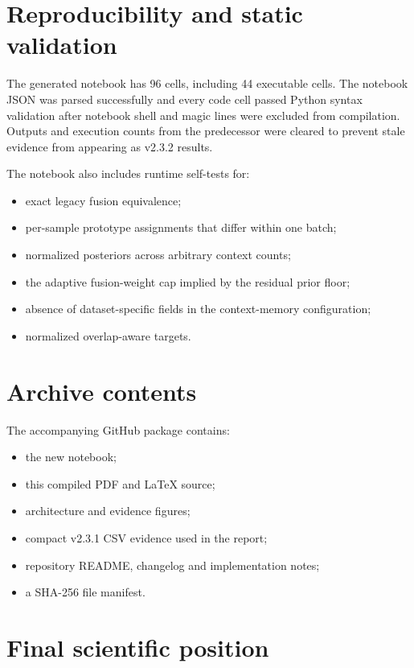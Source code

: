 \documentclass[11pt,a4paper]{article}
\begin{document}
\section{Reproducibility and static validation}

The generated notebook has 96 cells, including 44 executable cells. The notebook JSON was parsed successfully and every code cell passed Python syntax validation after notebook shell and magic lines were excluded from compilation. Outputs and execution counts from the predecessor were cleared to prevent stale evidence from appearing as v2.3.2 results.

The notebook also includes runtime self-tests for:

\begin{itemize}[leftmargin=1.5em]
\item exact legacy fusion equivalence;
\item per-sample prototype assignments that differ within one batch;
\item normalized posteriors across arbitrary context counts;
\item the adaptive fusion-weight cap implied by the residual prior floor;
\item absence of dataset-specific fields in the context-memory configuration;
\item normalized overlap-aware targets.
\end{itemize}

\section{Archive contents}

The accompanying GitHub package contains:

\begin{itemize}[leftmargin=1.5em]
\item the new notebook;
\item this compiled PDF and LaTeX source;
\item architecture and evidence figures;
\item compact v2.3.1 CSV evidence used in the report;
\item repository README, changelog and implementation notes;
\item a SHA-256 file manifest.
\end{itemize}

\section{Final scientific position}
\end{document}
